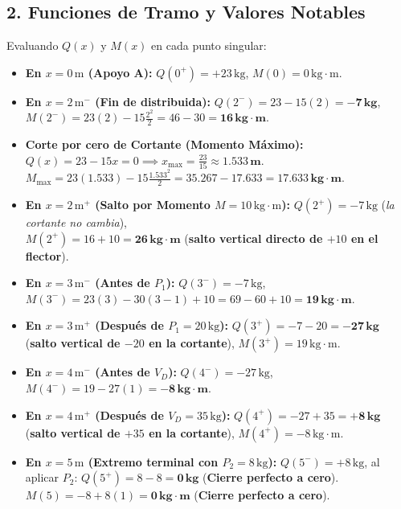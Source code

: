 \documentclass[10pt,a4paper]{article}
\begin{document}
\subsection{2. Funciones de Tramo y Valores Notables}
Evaluando $Q(x)$ y $M(x)$ en cada punto singular:
\begin{itemize}[leftmargin=*,itemsep=2pt]
    \item \textbf{En $x = 0\,\text{m}$ (Apoyo A):}
          $Q(0^+) = +23\,\text{kg}$, \quad $M(0) = 0\,\text{kg}\cdot\text{m}$.
    \item \textbf{En $x = 2\,\text{m}^-$ (Fin de distribuida):}
          $Q(2^-) = 23 - 15(2) = \mathbf{-7\,\text{kg}}$, \quad $M(2^-) = 23(2) - 15\frac{2^2}{2} = 46 - 30 = \mathbf{16\,\text{kg}\cdot\text{m}}$.
    \item \textbf{Corte por cero de Cortante (Momento Máximo):}
          $Q(x) = 23 - 15 x = 0 \implies x_{\text{max}} = \frac{23}{15} \approx \mathbf{1.533\,\text{m}}$. \\
          $M_{\text{max}} = 23(1.533) - 15 \frac{1.533^2}{2} = 35.267 - 17.633 = \mathbf{17.633\,\text{kg}\cdot\text{m}}$.
    \item \textbf{En $x = 2\,\text{m}^+$ (Salto por Momento $M = 10\,\text{kg}\cdot\text{m}$):}
          $Q(2^+) = -7\,\text{kg}$ (\textit{la cortante no cambia}), \\
          $M(2^+) = 16 + 10 = \mathbf{26\,\text{kg}\cdot\text{m}}$ (\textbf{salto vertical directo de $+10$ en el flector}).
    \item \textbf{En $x = 3\,\text{m}^-$ (Antes de $P_1$):}
          $Q(3^-) = -7\,\text{kg}$, \quad $M(3^-) = 23(3) - 30(3 - 1) + 10 = 69 - 60 + 10 = \mathbf{19\,\text{kg}\cdot\text{m}}$.
    \item \textbf{En $x = 3\,\text{m}^+$ (Después de $P_1 = 20\,\text{kg}$):}
          $Q(3^+) = -7 - 20 = \mathbf{-27\,\text{kg}}$ (\textbf{salto vertical de $-20$ en la cortante}), \quad $M(3^+) = 19\,\text{kg}\cdot\text{m}$.
    \item \textbf{En $x = 4\,\text{m}^-$ (Antes de $V_D$):}
          $Q(4^-) = -27\,\text{kg}$, \quad $M(4^-) = 19 - 27(1) = \mathbf{-8\,\text{kg}\cdot\text{m}}$.
    \item \textbf{En $x = 4\,\text{m}^+$ (Después de $V_D = 35\,\text{kg}$):}
          $Q(4^+) = -27 + 35 = \mathbf{+8\,\text{kg}}$ (\textbf{salto vertical de $+35$ en la cortante}), \quad $M(4^+) = -8\,\text{kg}\cdot\text{m}$.
    \item \textbf{En $x = 5\,\text{m}$ (Extremo terminal con $P_2 = 8\,\text{kg}$):}
          $Q(5^-) = +8\,\text{kg}$, \quad al aplicar $P_2$: $Q(5^+) = 8 - 8 = \mathbf{0\,\text{kg}}$ (\textbf{Cierre perfecto a cero}). \\
          $M(5) = -8 + 8(1) = \mathbf{0\,\text{kg}\cdot\text{m}}$ (\textbf{Cierre perfecto a cero}).
\end{itemize}
\end{document}
